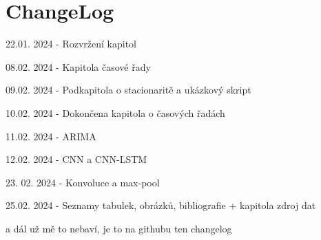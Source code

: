 \documentclass[FM,BP,fonts]{tulthesis}
\begin{document}
\chapter{ChangeLog}

22.01. 2024 - Rozvržení kapitol

08.02. 2024 - Kapitola časové řady

09.02. 2024 - Podkapitola o stacionaritě a ukázkový skript

10.02. 2024 - Dokončena kapitola o časových řadách

11.02. 2024 - ARIMA 

12.02. 2024 - CNN a CNN-LSTM 

23. 02. 2024 - Konvoluce a max-pool

25.02. 2024 - Seznamy tabulek, obrázků, bibliografie + kapitola zdroj dat

a dál už mě to nebaví, je to na githubu ten changelog


\printbibliography[title={Použitá literatura}] %

\end{document}
